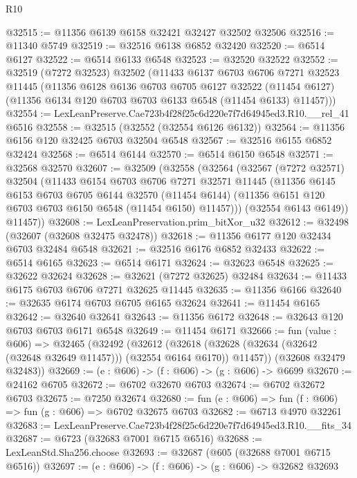 \begin{lexlean}{R10}
\begin{coremodule}
@32515 := @11356 @6139 @6158 @32421 @32427 @32502 @32506
@32516 := @11340 @5749
@32519 := @32516 @6138 @6852 @32420
@32520 := @6514 @6127
@32522 := @6514 @6133 @6548
@32523 := @32520 @32522
@32552 := @32519
    (@7272 @32523)
    @32502
    (@11433
      @6137
      @6703
      @6706
      @7271
      @32523
      @11445
      (@11356
        @6128
        @6136
        @6703
        @6705
        @6127
        @32522
        (@11454 @6127)
        (@11356 @6134 @120 @6703 @6703 @6133 @6548 (@11454 @6133) @11457)))
@32554 := LexLeanPreserve.Cae723b4f28f25c6d220e7f7d64945ed3.R10.__rel_41 @6516
@32558 := @32515 (@32552 (@32554 @6126 @6132))
@32564 := @11356 @6156 @120 @32425 @6703 @32504 @6548
@32567 := @32516 @6155 @6852 @32424
@32568 := @6514 @6144
@32570 := @6514 @6150 @6548
@32571 := @32568 @32570
@32607 := @32509
    (@32558
      (@32564
        (@32567
          (@7272 @32571)
          @32504
          (@11433
            @6154
            @6703
            @6706
            @7271
            @32571
            @11445
            (@11356
              @6145
              @6153
              @6703
              @6705
              @6144
              @32570
              (@11454 @6144)
              (@11356 @6151 @120 @6703 @6703 @6150 @6548 (@11454 @6150) @11457)))
          (@32554 @6143 @6149))
        @11457))
@32608 := LexLeanPreservation.prim_bitXor_u32
@32612 := @32498 (@32607 (@32608 @32475 @32478))
@32618 := @11356 @6177 @120 @32434 @6703 @32484 @6548
@32621 := @32516 @6176 @6852 @32433
@32622 := @6514 @6165
@32623 := @6514 @6171
@32624 := @32623 @6548
@32625 := @32622 @32624
@32628 := @32621 (@7272 @32625) @32484
@32634 := @11433 @6175 @6703 @6706 @7271 @32625 @11445
@32635 := @11356 @6166
@32640 := @32635 @6174 @6703 @6705 @6165 @32624
@32641 := @11454 @6165
@32642 := @32640 @32641
@32643 := @11356 @6172
@32648 := @32643 @120 @6703 @6703 @6171 @6548
@32649 := @11454 @6171
@32666 := fun (value : @606) =>
  @32465
    (@32492
      (@32612
        (@32618 (@32628 (@32634 (@32642 (@32648 @32649 @11457))) (@32554 @6164 @6170)) @11457))
      (@32608 @32479 @32483))
@32669 := (e : @606) -> (f : @606) -> (g : @606) -> @6699
@32670 := @24162 @6705
@32672 := @6702 @32670 @6703
@32674 := @6702 @32672 @6703
@32675 := @7250 @32674
@32680 := fun (e : @606) => fun (f : @606) => fun (g : @606) => @6702 @32675 @6703
@32682 := @6713 @4970 @32261
@32683 := LexLeanPreserve.Cae723b4f28f25c6d220e7f7d64945ed3.R10.__fits_34
@32687 := @6723 (@32683 @7001 @6715 @6516)
@32688 := LexLeanStd.Sha256.choose
@32693 := @32687 (@605 (@32688 @7001 @6715 @6516))
@32697 := (e : @606) -> (f : @606) -> (g : @606) -> @32682 @32693

\end{coremodule}
\end{lexlean}
